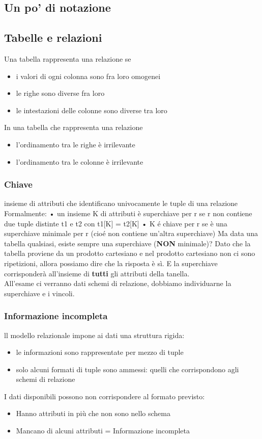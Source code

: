 \begin{itemize}
\subsection{Un po' di notazione}


\subsection{Tabelle e relazioni}
Una tabella rappresenta una relazione se
\begin{itemize}
    \item i valori di ogni colonna sono fra loro omogenei
    \item le righe sono diverse fra loro
    \item le intestazioni delle colonne sono diverse tra loro
\end{itemize}
In una tabella che rappresenta una relazione
\begin{itemize}
    \item l'ordinamento tra le righe è irrilevante
    \item l'ordinamento tra le colonne è irrilevante
\end{itemize}

\subsubsection{Chiave}
insieme di attributi che identificano univocamente le tuple di
una relazione
Formalmente:
• un insieme K di attributi è superchiave per r se r non
contiene due tuple distinte t1 e t2 con t1[K] = t2[K]
• K é chiave per r se è una superchiave minimale per r (cioé non contiene un'altra superchiave)
Ma data una tabella qualsiasi, esiste sempre una superchiave (\textbf{NON} minimale)? Dato che la tabella proviene da un prodotto cartesiano e nel prodotto cartesiano non ci sono ripetizioni, allora possiamo dire che la risposta è sì. E la superchiave corrisponderà all'insieme di \textbf{tutti} gli attributi della tanella.
\\All'esame ci verranno dati schemi di relazione, dobbiamo individuarne la superchiave e i vincoli.

\subsubsection{Informazione incompleta}
ll modello relazionale impone ai dati una struttura rigida:
\begin{itemize}
    \item le informazioni sono rappresentate per mezzo di tuple
    \item solo alcuni formati di tuple sono ammessi: quelli che corrispondono agli schemi di relazione
\end{itemize}
I dati disponibili possono non corrispondere al formato previsto:
\begin{itemize}
    \item Hanno attributi in più che non sono nello schema
    \item Mancano di alcuni attributi = Informazione incompleta
\end{itemize}


\end{itemize}
